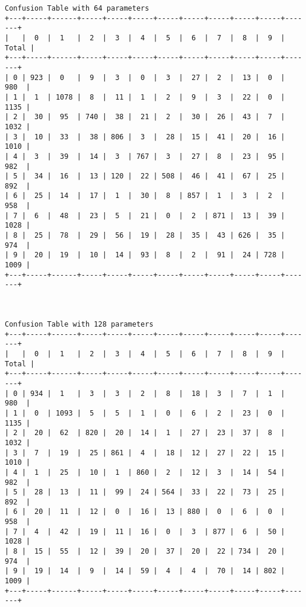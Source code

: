 \documentclass[11pt]{article}
\begin{document}
\begin{Verbatim}[commandchars=\\\{\}]
Confusion Table with 64 parameters
+---+-----+------+-----+-----+-----+-----+-----+-----+-----+-----+-------+
|   |  0  |  1   |  2  |  3  |  4  |  5  |  6  |  7  |  8  |  9  | Total |
+---+-----+------+-----+-----+-----+-----+-----+-----+-----+-----+-------+
| 0 | 923 |  0   |  9  |  3  |  0  |  3  |  27 |  2  |  13 |  0  |  980  |
| 1 |  1  | 1078 |  8  |  11 |  1  |  2  |  9  |  3  |  22 |  0  |  1135 |
| 2 |  30 |  95  | 740 |  38 |  21 |  2  |  30 |  26 |  43 |  7  |  1032 |
| 3 |  10 |  33  |  38 | 806 |  3  |  28 |  15 |  41 |  20 |  16 |  1010 |
| 4 |  3  |  39  |  14 |  3  | 767 |  3  |  27 |  8  |  23 |  95 |  982  |
| 5 |  34 |  16  |  13 | 120 |  22 | 508 |  46 |  41 |  67 |  25 |  892  |
| 6 |  25 |  14  |  17 |  1  |  30 |  8  | 857 |  1  |  3  |  2  |  958  |
| 7 |  6  |  48  |  23 |  5  |  21 |  0  |  2  | 871 |  13 |  39 |  1028 |
| 8 |  25 |  78  |  29 |  56 |  19 |  28 |  35 |  43 | 626 |  35 |  974  |
| 9 |  20 |  19  |  10 |  14 |  93 |  8  |  2  |  91 |  24 | 728 |  1009 |
+---+-----+------+-----+-----+-----+-----+-----+-----+-----+-----+-------+



Confusion Table with 128 parameters
+---+-----+------+-----+-----+-----+-----+-----+-----+-----+-----+-------+
|   |  0  |  1   |  2  |  3  |  4  |  5  |  6  |  7  |  8  |  9  | Total |
+---+-----+------+-----+-----+-----+-----+-----+-----+-----+-----+-------+
| 0 | 934 |  1   |  3  |  3  |  2  |  8  |  18 |  3  |  7  |  1  |  980  |
| 1 |  0  | 1093 |  5  |  5  |  1  |  0  |  6  |  2  |  23 |  0  |  1135 |
| 2 |  20 |  62  | 820 |  20 |  14 |  1  |  27 |  23 |  37 |  8  |  1032 |
| 3 |  7  |  19  |  25 | 861 |  4  |  18 |  12 |  27 |  22 |  15 |  1010 |
| 4 |  1  |  25  |  10 |  1  | 860 |  2  |  12 |  3  |  14 |  54 |  982  |
| 5 |  28 |  13  |  11 |  99 |  24 | 564 |  33 |  22 |  73 |  25 |  892  |
| 6 |  20 |  11  |  12 |  0  |  16 |  13 | 880 |  0  |  6  |  0  |  958  |
| 7 |  4  |  42  |  19 |  11 |  16 |  0  |  3  | 877 |  6  |  50 |  1028 |
| 8 |  15 |  55  |  12 |  39 |  20 |  37 |  20 |  22 | 734 |  20 |  974  |
| 9 |  19 |  14  |  9  |  14 |  59 |  4  |  4  |  70 |  14 | 802 |  1009 |
+---+-----+------+-----+-----+-----+-----+-----+-----+-----+-----+-------+




\end{Verbatim}
\end{document}
